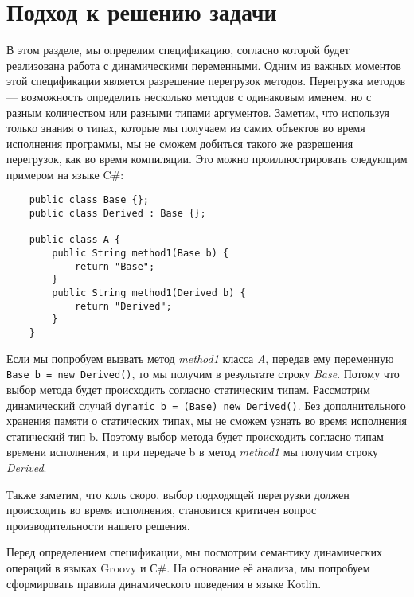 \section{Подход к решению задачи}



В этом разделе, мы определим спецификацию, согласно которой будет реализована работа с динамическими переменными.  Одним из важных моментов этой спецификации является разрешение перегрузок методов. Перегрузка методов --- возможность определить несколько методов с одинаковым именем, но с разным количеством или разными типами аргументов. 
Заметим, что используя только знания о типах, которые мы получаем из самих объектов во время исполнения программы, мы не сможем добиться такого же разрешения перегрузок, как во время компиляции. Это можно проиллюстрировать следующим примером на языке C{\#}:

\begin{verbatim}
    public class Base {};
    public class Derived : Base {};
    
    public class A {
        public String method1(Base b) {
            return "Base";
        }
        public String method1(Derived b) {
            return "Derived";
        }
    }
\end{verbatim}

Если мы попробуем вызвать метод \textit{method1} класса \textit{A}, передав ему переменную  \texttt{Base b = new Derived()}, то мы получим в результате строку \textit{Base}. Потому что выбор метода будет происходить согласно статическим типам. Рассмотрим динамический случай \texttt{dynamic b = (Base) new Derived()}.
Без дополнительного хранения памяти о статических типах, мы не сможем узнать во время исполнения статический тип b. Поэтому выбор метода будет происходить согласно типам времени исполнения, и при передаче b в метод \textit{method1} мы получим строку \textit{Derived}.

Также заметим, что коль скоро, выбор подходящей перегрузки должен происходить во время исполнения, становится критичен вопрос производительности нашего решения.

Перед определением спецификации, мы посмотрим семантику динамических операций в языках Groovy и С\#. На основание её анализа, мы попробуем сформировать правила динамического поведения в языке Kotlin.


